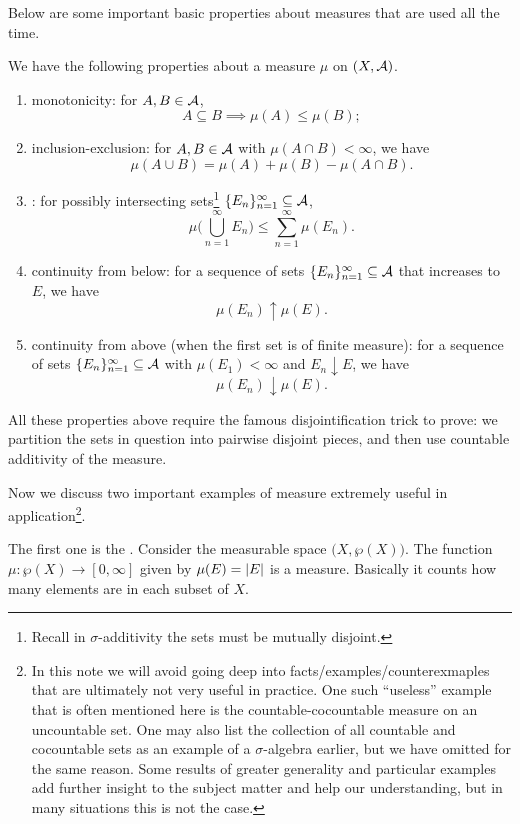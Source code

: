 Below are some important basic properties about measures that are used all the time.
\begin{prop}\label{prop:basic-properties-measure}
    We have the following properties about a measure $\mu$ on $(X,\mathcal{A})$.
    \begin{enumerate}
        \item monotonicity: for $A,B\in \mathcal{A}$, \[
            A\subseteq B \implies \mu(A)\leq \mu(B);
        \]
        \item inclusion-exclusion: for $A,B \in \mathcal{A}$ with $\mu(A \cap B) < \infty$, we have \[
            \mu(A \cup B) = \mu(A) + \mu(B) - \mu(A\cap B).
        \]
        \item {}: for possibly intersecting sets\footnote{Recall in $\sigma$-additivity the sets must be mutually disjoint.} $\{E_n\}_{n=1}^\infty \subseteq \mathcal{A}$, \[
            \mu\biggl(\bigcup_{n=1}^\infty E_n\biggr) \leq \sum_{n=1}^\infty \mu(E_n).
        \]
        \item continuity from below: for a sequence of sets $\{E_n\}_{n=1}^\infty \subseteq \mathcal{A}$ that increases to $E$, we have \[
            \mu(E_n) \uparrow \mu(E).
        \]
        \item continuity from above (when the first set is of finite measure): for a sequence of sets $\{E_n\}_{n=1}^\infty \subseteq \mathcal{A}$ with $\mu(E_1)<\infty$ and $E_n \downarrow E$, we have \[
             \mu(E_n) \downarrow \mu(E).
        \]
    \end{enumerate}
\end{prop}
All these properties above require the famous disjointification trick to prove: we partition the sets in question into pairwise disjoint pieces, and then use countable additivity of the measure.

Now we discuss two important examples of measure extremely useful in application\footnote{In this note we will avoid going deep into facts/examples/counterexmaples that are ultimately not very useful in practice. One such ``useless'' example that is often mentioned here is the countable-cocountable measure on an uncountable set. One may also list the collection of all countable and cocountable sets as an example of a $\sigma$-algebra earlier, but we have omitted for the same reason. Some results of greater generality and particular examples add further insight to the subject matter and help our understanding, but in many situations this is not the case.}.

The first one is the . Consider the measurable space $\bigl(X,\wp(X)\bigr)$. The function $\mu\colon \wp(X) \to [0,\infty]$ given by $\mu(E) = \lvert E \rvert$ is a measure. Basically it counts how many elements are in each subset of $X$.

